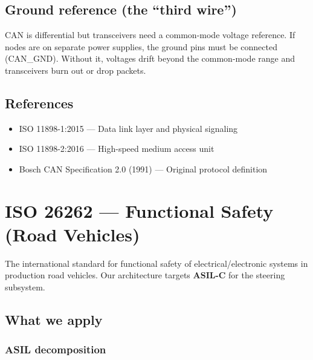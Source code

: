 \documentclass[12pt,a4paper,oneside]{report}
\providecommand{\tightlist}{\setlength{\itemsep}{0pt}\setlength{\parskip}{0pt}}
\begin{document}
\section{Ground reference (the ``third
wire'')}\label{ground-reference-the-third-wire}

CAN is differential but transceivers need a common-mode voltage reference. If
nodes are on separate power supplies, the ground pins must be connected
(CAN\_GND). Without it, voltages drift beyond the common-mode range and
transceivers burn out or drop packets.

\section{References}\label{references}

\begin{itemize}
\tightlist
\item
  ISO 11898-1:2015 --- Data link layer and physical signaling
\item
  ISO 11898-2:2016 --- High-speed medium access unit
\item
  Bosch CAN Specification 2.0 (1991) --- Original protocol definition
\end{itemize}


\chapter{ISO 26262 --- Functional Safety (Road
Vehicles)}\label{iso-26262-functional-safety-road-vehicles}

The international standard for functional safety of electrical/electronic
systems in production road vehicles. Our architecture targets \textbf{ASIL-C}
for the steering subsystem.

\section{What we apply}\label{what-we-apply}

\subsection{ASIL decomposition}\label{asil-decomposition}
\end{document}

